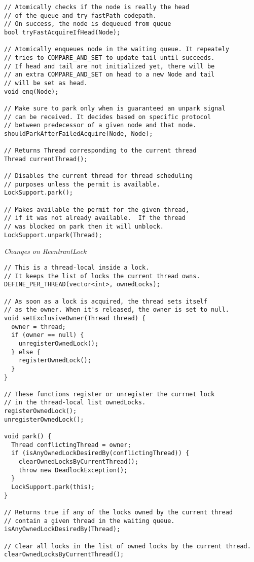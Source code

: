 \begin{verbatim}
// Atomically checks if the node is really the head
// of the queue and try fastPath codepath.
// On success, the node is dequeued from queue
bool tryFastAcquireIfHead(Node);

// Atomically enqueues node in the waiting queue. It repeately
// tries to COMPARE_AND_SET to update tail until succeeds.
// If head and tail are not initialized yet, there will be
// an extra COMPARE_AND_SET on head to a new Node and tail
// will be set as head.
void enq(Node);

// Make sure to park only when is guaranteed an unpark signal
// can be received. It decides based on specific protocol
// between predecessor of a given node and that node.
shouldParkAfterFailedAcquire(Node, Node);

// Returns Thread corresponding to the current thread
Thread currentThread();

// Disables the current thread for thread scheduling
// purposes unless the permit is available.
LockSupport.park();

// Makes available the permit for the given thread,
// if it was not already available.  If the thread
// was blocked on park then it will unblock.
LockSupport.unpark(Thread);
\end{verbatim}

\medskip

\noindent
{\it Changes on ReentrantLock}
\begin{verbatim}
// This is a thread-local inside a lock.
// It keeps the list of locks the current thread owns.
DEFINE_PER_THREAD(vector<int>, ownedLocks);

// As soon as a lock is acquired, the thread sets itself
// as the owner. When it's released, the owner is set to null.
void setExclusiveOwner(Thread thread) {
  owner = thread;
  if (owner == null) {
    unregisterOwnedLock();
  } else {
    registerOwnedLock();
  }
}

// These functions register or unregister the currnet lock
// in the thread-local list ownedLocks.
registerOwnedLock();
unregisterOwnedLock();

void park() {
  Thread conflictingThread = owner;
  if (isAnyOwnedLockDesiredBy(conflictingThread)) {
    clearOwnedLocksByCurrentThread();
    throw new DeadlockException();
  }
  LockSupport.park(this);
}

// Returns true if any of the locks owned by the current thread
// contain a given thread in the waiting queue.
isAnyOwnedLockDesiredBy(Thread);

// Clear all locks in the list of owned locks by the current thread.
clearOwnedLocksByCurrentThread();
\end{verbatim}





